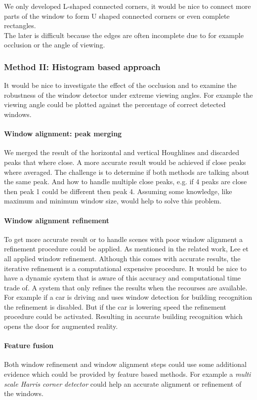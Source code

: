 We only developed L-shaped connected corners, it would be nice to connect more
parts of the window to form U shaped connected corners or even complete rectangles.\\
The later is difficult because the edges are often incomplete due to for example occlusion 
or the angle of viewing.


\subsubsection{Method II: Histogram based approach} 
It would be nice to investigate the effect of the occlusion and to examine the
robustness of the window detector under extreme viewing angles.
For example the viewing angle could be plotted against the percentage of
correct detected windows.

\paragraph{Window alignment: peak merging}
We merged the result of the horizontal and vertical Houghlines and discarded
peaks that where close.  A more accurate result would be achieved if close peaks
where averaged.  The challenge is to determine if both methods are talking about
the same peak. And how to handle multiple close peaks, e.g. if 4 peaks
are close then peak 1 could be different then peak 4.  Assuming some knowledge,
like maximum and minimum window size, would help to solve this problem.

\paragraph{Window alignment refinement}
To get more accurate result or to handle scenes with poor window alignment a refinement procedure could be applied.
As mentioned in the related work, Lee et all \cite{Lee_extraction} applied window refinement.
Although this comes with accurate results, the iterative refinement is a
computational expensive procedure. 
It would be nice to have a dynamic system that is aware of this 
accuracy and computational time trade of. A system that only refines the results when the recourses are available.
For example if a car is driving and uses window detection for building recognition the refinement is disabled.
But if the car is lowering speed the refinement procedure could be activated.
Resulting in accurate building recognition which opens the door for augmented reality.

\paragraph{Feature fusion}
Both window refinement and window alignment steps could use some additional
evidence which could be provided by feature based methods.  For example a
\emph{multi scale Harris corner detector} could help an accurate alignment or
refinement of the windows.


